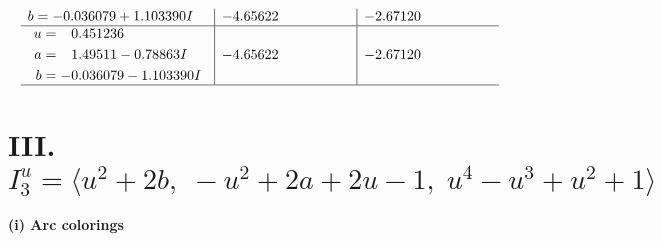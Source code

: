 \documentclass[1p]{elsarticle_modified}
\theoremstyle{definition}
\begin{document}
$$\begin{array}{c|c|c}
\begin{aligned}
b &= -0.036079 + 1.103390 I\end{aligned}
 & -4.65622\phantom{ +0.000000I} & -2.67120\phantom{ +0.000000I} \\ \hline\begin{aligned}
u &= \phantom{-}0.451236\phantom{ +0.000000I} \\
a &= \phantom{-}1.49511 - 0.78863 I \\
b &= -0.036079 - 1.103390 I\end{aligned}
 & -4.65622\phantom{ +0.000000I} & -2.67120\phantom{ +0.000000I}\\
 \hline 
 \end{array}$$\newpage\newpage\renewcommand{\arraystretch}{1}
\centering \section*{III. $I^u_{3}= \langle u^2+2 b,\;- u^2+2 a+2 u-1,\;u^4- u^3+u^2+1 \rangle$}
\flushleft \textbf{(i) Arc colorings}\\
\end{document}
